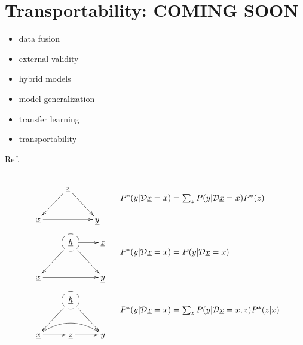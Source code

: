 \chapter{Transportability: COMING SOON}
\label{ch-transport}

\begin{itemize}
\item data fusion
\item external validity
\item hybrid models
\item model generalization
\item transfer learning
\item transportability
\end{itemize}



Ref.\cite{pearl2011trans}

\begin{figure}[h!]
$$
\begin{array}{ll}
\xymatrix{
&\rvz\ar[dl]\ar[dr]
\\
\rvx\ar[rr]&&\rvy
}
&
\begin{array}{l}
\\
\\
P^*(y|\cald \rvx=x)=
\sum_z
P(y|\cald \rvx=x)P^*(z)
\end{array}
\\
\xymatrix{
&*++[F-o]{\rvh}\ar[dl]\ar[dr]\ar[r]
&\rvz
\\
\rvx\ar[rr]&&\rvy
}
&
\begin{array}{l}
\\
\\
P^*(y|\cald \rvx=x)=
P(y|\cald \rvx=x)
\end{array}
\\
\xymatrix{
&*++[F-o]{\rvh}\ar[dl]\ar[dr]
\\
\rvx\ar[r]\ar@/^1.2pc/[rr]
&\rvz\ar[r]&\rvy
}
&
\begin{array}{l}
\\
\\
P^*(y|\cald \rvx=x)=
\sum_z
P(y|\cald \rvx=x, z)P^*(z|x)
\end{array}
\end{array}
$$
\end{figure}


